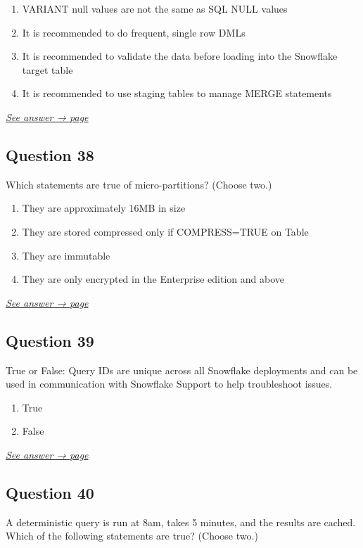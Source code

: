 \documentclass[12pt]{article}
\newcommand{\seeanswer}[1]{%
  \par\smallskip\emph{\hyperref[ans:#1]{See answer → page \pageref{ans:#1}}}%
}
\begin{document}
\begin{enumerate}[label=\Alph*.]
  \item VARIANT null values are not the same as SQL NULL values
  \item It is recommended to do frequent, single row DMLs
  \item It is recommended to validate the data before loading into the Snowflake target table
  \item It is recommended to use staging tables to manage MERGE statements
\end{enumerate}
\seeanswer{37}

\subsection*{Question 38}\label{q:38}
Which statements are true of micro-partitions? (Choose two.)

\begin{enumerate}[label=\Alph*.]
  \item They are approximately 16MB in size
  \item They are stored compressed only if COMPRESS=TRUE on Table
  \item They are immutable
  \item They are only encrypted in the Enterprise edition and above
\end{enumerate}
\seeanswer{38}

\subsection*{Question 39}\label{q:39}
True or False: Query IDs are unique across all Snowflake deployments and can be used in communication with Snowflake Support to help troubleshoot issues.

\begin{enumerate}[label=\Alph*.]
  \item True
  \item False
\end{enumerate}
\seeanswer{39}

\subsection*{Question 40}\label{q:40}
A deterministic query is run at 8am, takes 5 minutes, and the results are cached. Which of the following statements are true? (Choose two.)
\end{document}
